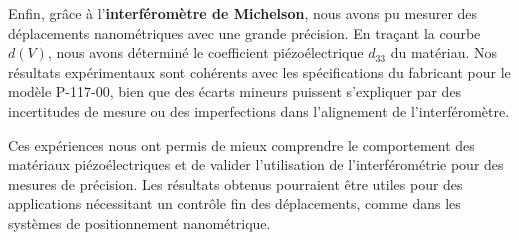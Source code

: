 \documentclass[letterpaper,12pt]{article}
\begin{document}
Enfin, grâce à l'\textbf{interféromètre de Michelson}, nous avons pu mesurer des déplacements nanométriques avec une grande précision. En traçant la courbe $d(V)$, nous avons déterminé le coefficient piézoélectrique $d_{33}$ du matériau. Nos résultats expérimentaux sont cohérents avec les spécifications du fabricant pour le modèle P-117-00, bien que des écarts mineurs puissent s'expliquer par des incertitudes de mesure ou des imperfections dans l'alignement de l'interféromètre.

Ces expériences nous ont permis de mieux comprendre le comportement des matériaux piézoélectriques et de valider l'utilisation de l'interférométrie pour des mesures de précision. Les résultats obtenus pourraient être utiles pour des applications nécessitant un contrôle fin des déplacements, comme dans les systèmes de positionnement nanométrique.




\end{document}
